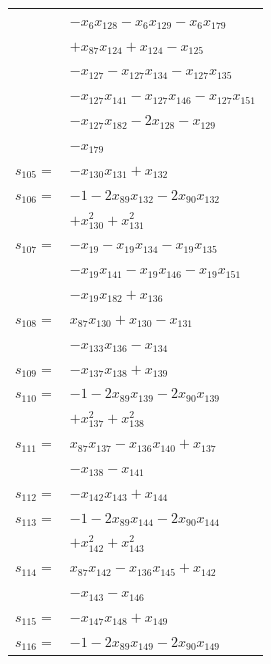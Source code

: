\begin{longtable}{@{}r@{\;}l@{}}
 & \(\displaystyle -x_{6}x_{128} -x_{6}x_{129} -x_{6}x_{179}\) \\
 & \(\displaystyle +x_{87}x_{124} +x_{124} -x_{125}\) \\
 & \(\displaystyle -x_{127} -x_{127}x_{134} -x_{127}x_{135}\) \\
 & \(\displaystyle -x_{127}x_{141} -x_{127}x_{146} -x_{127}x_{151}\) \\
 & \(\displaystyle -x_{127}x_{182} -2x_{128} -x_{129}\) \\
 & \(\displaystyle -x_{179}\) \\[3pt]
\(s_{105}=\) & \(\displaystyle -x_{130}x_{131} +x_{132}\) \\[3pt]
\(s_{106}=\) & \(\displaystyle -1 -2x_{89}x_{132} -2x_{90}x_{132}\) \\
 & \(\displaystyle +x_{130}^{2} +x_{131}^{2}\) \\[3pt]
\(s_{107}=\) & \(\displaystyle -x_{19} -x_{19}x_{134} -x_{19}x_{135}\) \\
 & \(\displaystyle -x_{19}x_{141} -x_{19}x_{146} -x_{19}x_{151}\) \\
 & \(\displaystyle -x_{19}x_{182} +x_{136}\) \\[3pt]
\(s_{108}=\) & \(\displaystyle x_{87}x_{130} +x_{130} -x_{131}\) \\
 & \(\displaystyle -x_{133}x_{136} -x_{134}\) \\[3pt]
\(s_{109}=\) & \(\displaystyle -x_{137}x_{138} +x_{139}\) \\[3pt]
\(s_{110}=\) & \(\displaystyle -1 -2x_{89}x_{139} -2x_{90}x_{139}\) \\
 & \(\displaystyle +x_{137}^{2} +x_{138}^{2}\) \\[3pt]
\(s_{111}=\) & \(\displaystyle x_{87}x_{137} -x_{136}x_{140} +x_{137}\) \\
 & \(\displaystyle -x_{138} -x_{141}\) \\[3pt]
\(s_{112}=\) & \(\displaystyle -x_{142}x_{143} +x_{144}\) \\[3pt]
\(s_{113}=\) & \(\displaystyle -1 -2x_{89}x_{144} -2x_{90}x_{144}\) \\
 & \(\displaystyle +x_{142}^{2} +x_{143}^{2}\) \\[3pt]
\(s_{114}=\) & \(\displaystyle x_{87}x_{142} -x_{136}x_{145} +x_{142}\) \\
 & \(\displaystyle -x_{143} -x_{146}\) \\[3pt]
\(s_{115}=\) & \(\displaystyle -x_{147}x_{148} +x_{149}\) \\[3pt]
\(s_{116}=\) & \(\displaystyle -1 -2x_{89}x_{149} -2x_{90}x_{149}\) \\

\end{longtable}
